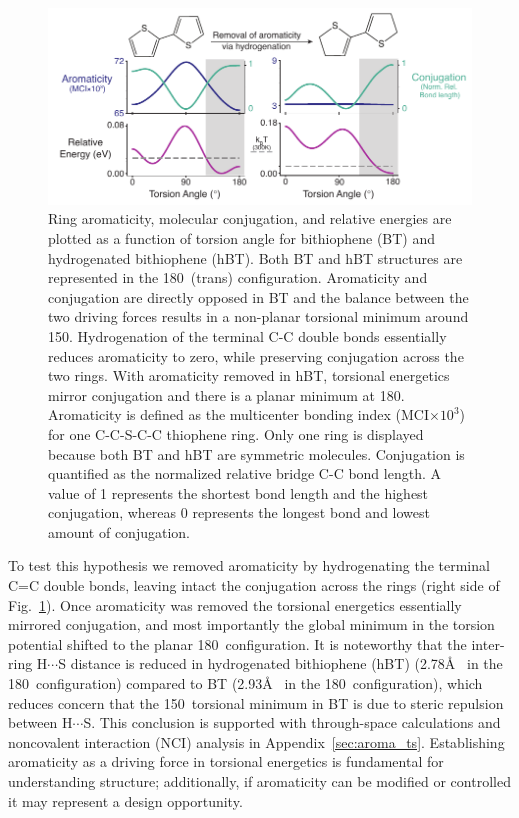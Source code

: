 \begin{figure}[hbt!]
    \centering
    \includegraphics{figures/chap3/fig1_d2.pdf}
    \caption[Torsional Aromaticity, Conjugation, and Energy of BT]{Ring aromaticity, molecular conjugation, and relative energies are plotted as a function of torsion angle for bithiophene (BT) and hydrogenated bithiophene (hBT). Both BT and hBT structures are represented in the 180\textdegree \ (trans) configuration. Aromaticity and conjugation are directly opposed in BT and the balance between the two driving forces results in a non-planar torsional minimum around 150\textdegree. Hydrogenation of the terminal C-C double bonds essentially reduces aromaticity to zero, while preserving conjugation across the two rings. With aromaticity removed in hBT, torsional energetics mirror conjugation and there is a planar minimum at 180\textdegree. Aromaticity is defined as the multicenter bonding index (MCI$\times 10^3$) for one C-C-S-C-C thiophene ring. Only one ring is displayed because both BT and hBT are symmetric molecules. Conjugation is quantified as the normalized relative bridge C-C bond length. A value of 1 represents the shortest bond length and the highest conjugation, whereas 0 represents the longest bond and lowest amount of conjugation.}
    \label{fig:a_vs_c}
\end{figure}

To test this hypothesis we removed aromaticity by hydrogenating the terminal C=C double bonds, leaving intact the conjugation across the rings (right side of Fig.~\ref{fig:a_vs_c}). Once aromaticity was removed the torsional energetics essentially mirrored conjugation, and most importantly the global minimum in the torsion potential shifted to the planar 180\textdegree \ configuration. It is noteworthy that the inter-ring H$\cdots$S distance is reduced in hydrogenated bithiophene (hBT) (2.78\si{\angstrom} \ in the 180\textdegree \ configuration) compared to BT (2.93\si{\angstrom} \ in the 180\textdegree \ configuration), which reduces concern that the 150\textdegree \ torsional minimum in BT is due to steric repulsion between H$\cdots$S. This conclusion is supported with through-space calculations and noncovalent interaction (NCI) analysis \cite{Johnson2010, Contreras-Garcia2011} in Appendix~\ref{sec:aroma_ts}. Establishing aromaticity as a driving force in torsional energetics is fundamental for understanding structure; additionally, if aromaticity can be modified or controlled it may represent a design opportunity.


